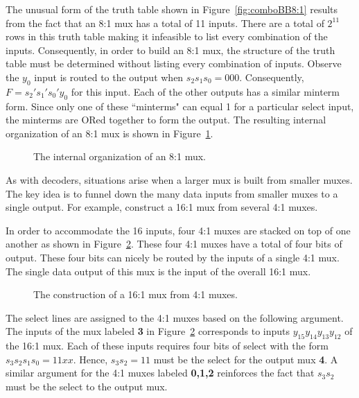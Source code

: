 The unusual form of the truth table shown in Figure~\ref{fig:comboBB8:1}
results from the fact that an 8:1 mux has a total of 11 
inputs.  There are a total of $2^{11}$ rows in this truth table
making it infeasible to list every combination of the inputs.
Consequently, in order to build an 8:1 mux, the structure of the truth table 
must be determined without
listing every combination of inputs.  Observe the $y_0$ input is routed 
to the output when 
$s_2 s_1 s_0 = 000$.  Consequently, $F=s_2' s_1' s_0' y_0$
for this input.  Each of the other outputs has a similar
minterm form.  Since only one of these ``minterms" can equal
1 for a particular select input, the minterms are ORed
together to form the output. The resulting internal 
organization of an 8:1 mux is shown in Figure~\ref{fig:comboBB8:1Guts}.

\begin{figure}[ht]
\caption{The internal organization of an 8:1 mux.}
\label{fig:comboBB8:1Guts}
\end{figure}

As with decoders, situations arise when a larger
mux is built from smaller muxes.  The key idea is to funnel down the many data 
inputs from smaller muxes to a single output.  For example, construct 
a 16:1 mux from several 4:1 muxes.  

In order to accommodate the 16 inputs, four 4:1 muxes are stacked
on top of one another as shown in Figure~\ref{fig:comboBBBigMux}.  These
four 4:1 muxes have a total of four bits of output.  These four bits
can nicely be routed by the inputs of a single 4:1 mux.  The
single data output of this mux is the input of the overall 16:1 mux.

\begin{figure}[ht]
\caption{The construction of a 16:1 mux from 4:1 muxes.}
\label{fig:comboBBBigMux}
\end{figure}

The select lines are assigned to the 4:1 muxes based on the following 
argument.  The inputs of the mux labeled \textbf{ 3} in
Figure~\ref{fig:comboBBBigMux} corresponds to inputs $y_{15} y_{14} y_{13} y_{12}$ 
of the 16:1 mux.  Each of these inputs requires four bits of 
select with the form $s_3 s_2 s_1 s_0 = 11xx$.  Hence, $s_3 s_2 = 11$ 
must be the select for the output mux \textbf{ 4}.  
A similar argument for the 4:1
muxes labeled \textbf{ 0,1,2} reinforces the fact that $s_3 s_2$ must be 
the select to the output mux.

